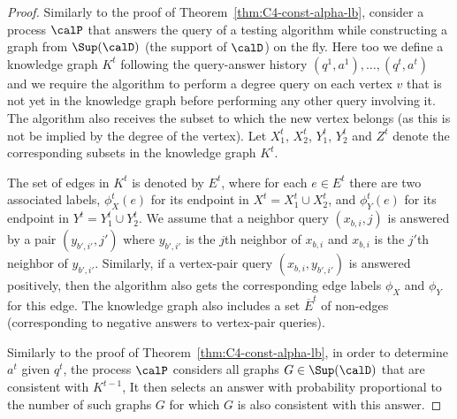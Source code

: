 \begin{proof}
Similarly to the proof of Theorem~\ref{thm:C4-const-alpha-lb}, consider a process $\calP$ that answers the query of a testing algorithm while constructing a graph from $\Sup(\calD)$ (the support of $\calD$) on the fly. Here too we define a knowledge graph $K^t$ following the query-answer history $(q^1,a^1),\dots,(q^t,a^t)$ and we require the algorithm to perform a degree query on each vertex $v$ that is not yet in the knowledge graph before performing any other query involving it. The algorithm also receives the subset to which the new vertex belongs (as this is not be implied by the degree of the vertex). Let $X_1^t$, $X_2^t$, $Y_1^t$, $Y_2^t$ and $Z^t$ denote the corresponding subsets in the knowledge graph $K^t$. %

The set of edges in $K^t$ is denoted by $E^t$, where for each $e\in E^t$ there are two associated labels,
$\phi^t_X(e)$ for its endpoint in $X^t = X_1^t \cup X_2^t$, and $\phi^t_Y(e)$ for its endpoint in $Y^t = Y_1^t \cup Y_2^t$.
 We assume that a neighbor query $(x_{b,i},j)$ is answered by a pair $(y_{b',i'},j')$ where
$y_{b',i'}$ is the $j$th neighbor of $x_{b,i}$ and $x_{b,i}$ is the $j'$th neighbor of $y_{b',i'}$. Similarly, if a vertex-pair query $(x_{b,i},y_{b',i'})$ is answered positively, then the algorithm also gets the corresponding edge labels $\phi_X$ and $\phi_Y$ for this edge. The knowledge graph also includes a set $\overline{E}^t$ of non-edges (corresponding to negative answers to vertex-pair queries).

Similarly to
the proof of Theorem~\ref{thm:C4-const-alpha-lb}, in order to
determine $a^t$ given $q^t$,
the process $\calP$ considers all graphs  $G\in \Sup(\calD)$
that are consistent with $K^{t-1}$,
It then selects an answer with probability proportional to the number of such graphs $G$ for which %
$G$ is also consistent with this answer.


\end{proof}
